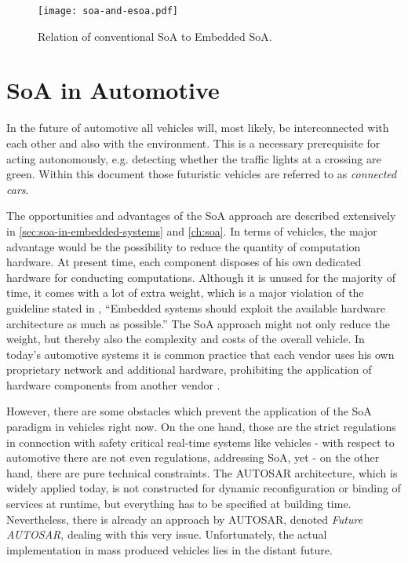 \begin{figure}[!htbp]
\centering
\texttt{[image: soa-and-esoa.pdf]}
\caption{Relation of conventional SoA to Embedded SoA.}
\label{fig:soa-and-esoa}
\end{figure}







\section{SoA in Automotive}
\label{sec:soa-in-automotive}

In the future of automotive all vehicles will, most likely, be interconnected with each other and also with the environment. This is a necessary prerequisite for acting autonomously, e.g. detecting whether the traffic lights at a crossing are green. Within this document those futuristic vehicles are referred to as \emph{connected cars}.

The opportunities and advantages of the SoA approach are described extensively in \ref{sec:soa-in-embedded-systems} and \ref{ch:soa}. In terms of vehicles, the major advantage would be the possibility to reduce the quantity of computation hardware. At present time, each component disposes of his own dedicated hardware for conducting computations. Although it is unused for the majority of time, it comes with a lot of extra weight, which is a major violation of the guideline stated in \cite[p.7]{marwedel}, ``Embedded systems should exploit the available hardware architecture as much as possible.'' The SoA approach might not only reduce the weight, but thereby also the complexity and costs of the overall vehicle. In today's automotive systems it is common practice that each vendor uses his own proprietary network and additional hardware, prohibiting the application of hardware components from another vendor \cite{sommer}.

However, there are some obstacles which prevent the application of the SoA paradigm in vehicles right now. On the one hand, those are the strict regulations in connection with safety critical real-time systems like vehicles \cite{kum} - with respect to automotive there are not even regulations, addressing SoA, yet - on the other hand, there are pure technical constraints. The \mbox{AUTOSAR} architecture, which is widely applied today, is not constructed for dynamic reconfiguration or binding of services at runtime, but everything has to be specified at building time. Nevertheless, there is already an approach by \mbox{AUTOSAR}, denoted \emph{Future \mbox{AUTOSAR}}, dealing with this very issue. Unfortunately, the actual implementation in mass produced vehicles lies in the distant future.

